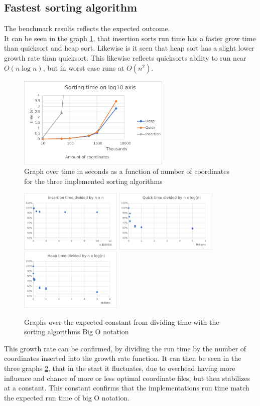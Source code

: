 \documentclass[12pt, a4paper]{article}
\begin{document}
		\subsection{Fastest sorting algorithm}
		
			The benchmark results reflects the expected outcome.\\
			It can be seen in the graph \ref{fig:performance}, that insertion sorts run time has a faster grow time than quicksort and heap sort. Likewise is it seen that heap sort has a slight lower growth rate than quicksort. This likewise reflects quicksorts ability to run near $O(n\log n)$, but in worst case runs at $O(n^2)$.\\	
			\begin{figure}[h]
				\centering
				\includegraphics[width=275px]{assets/performance.eps}
				\caption{Graph over time in seconds as a function of number of coordinates for the three implemented sorting algorithms}
				\label{fig:performance}
			\end{figure}	
			\begin{figure}[h]
				\centering
				\includegraphics[width=185px]{assets/insertion.eps}
				\includegraphics[width=185px]{assets/quickSort.eps}
				\includegraphics[width=185px]{assets/heapSort.eps}
				\caption{Graphs over the expected constant from dividing time with the sorting algorithms Big O notation}
				\label{fig:runTime}
			\end{figure}	
			This growth rate can be confirmed, by dividing the run time by the number of coordinates inserted into the growth rate function. It can then be seen in the three graphs \ref{fig:runTime}, that in the start it fluctuates, due to overhead having more influence and chance of more or less optimal coordinate files, but then stabilizes at a constant. This constant confirms that the implementations run time match the expected run time of big O notation.
\end{document}
